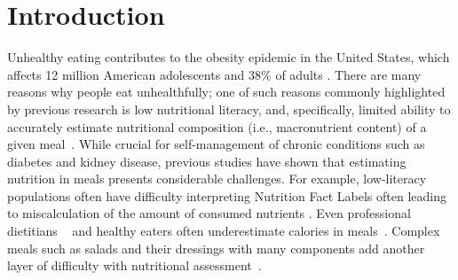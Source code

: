 \section{Introduction}
Unhealthy eating contributes to the obesity epidemic in the United States, which affects 12 million American adolescents and 38\% of adults \cite{trustforamericashealth,cdc2015,cdc2020}. 
There are many reasons why people eat unhealthfully; one of such reasons commonly highlighted by previous research is low nutritional literacy, and, specifically, limited ability to accurately estimate nutritional composition (i.e., macronutrient content) of a given meal~\cite{kindig2004health}. 
While crucial for self-management of chronic conditions such as diabetes and kidney disease, previous studies have shown that estimating nutrition in meals presents considerable challenges. For example, low-literacy populations often have difficulty interpreting Nutrition Fact Labels often leading to miscalculation of the amount of consumed nutrients \cite{chaudry2013formative,huizinga2009literacy,rothman2006patient}. Even professional dietitians 
~\cite{chandon2007obesity} and healthy eaters often underestimate calories in meals~\cite{chandon2007biasing}. Complex meals such as salads and their dressings with many components 
add another layer of difficulty with nutritional assessment~\cite{noronha2011platemate}.
 


